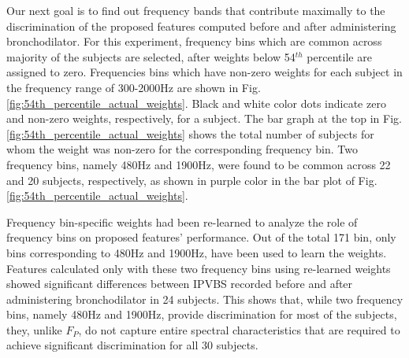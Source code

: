 \documentclass{article}
\begin{document}
Our next goal is to find out frequency bands that contribute maximally to the discrimination of the proposed features computed before and after administering bronchodilator. For this experiment, frequency bins which are common across majority of the subjects are selected, after weights below 54$^{th}$ percentile are assigned to zero. Frequencies bins which have non-zero weights for each subject in the frequency range of 300-2000Hz are shown in Fig. \ref{fig:54th_percentile_actual_weights}. Black and white color dots indicate zero and non-zero weights, respectively, for a subject. The bar graph at the top in Fig. \ref{fig:54th_percentile_actual_weights} shows the total number of subjects for whom the weight was non-zero for the corresponding frequency bin.
Two frequency bins, namely 480Hz and 1900Hz, were found to be common across 22 and 20 subjects, respectively, as shown in purple color in the bar plot of Fig. \ref{fig:54th_percentile_actual_weights}.

Frequency bin-specific weights had been re-learned to analyze the role of frequency bins on proposed features' performance. Out of the total 171 bin, only bins corresponding to 480Hz and 1900Hz, have been used to learn the weights. Features calculated only with these two frequency bins using re-learned weights showed significant differences between IPVBS recorded before and after administering bronchodilator in 24 subjects. This shows that, while two frequency bins, namely 480Hz and 1900Hz, provide discrimination for most of the subjects, they, unlike $F_P$, do not capture entire spectral characteristics that are required to achieve significant discrimination for all 30 subjects.
\end{document}
